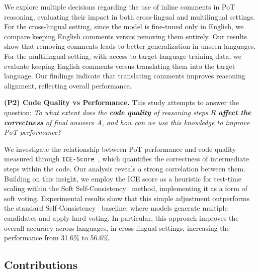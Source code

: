 We explore multiple decisions regarding the use of inline comments in PoT reasoning, evaluating their impact in both cross-lingual and multilingual settings.
%
For the cross-lingual setting, since the model is fine-tuned only in English, we compare keeping English comments versus removing them entirely. 
%
Our results show that removing comments leads to better generalization in unseen languages.
%
For the multilingual setting, with access to target-language training data, we evaluate keeping English comments versus translating them into the target language. 
%
Our findings indicate that translating comments improves reasoning alignment, reflecting overall performance.

\noindent
\textbf{(P2) Code Quality vs Performance.}
%
This study attempts to answer the question: 
%
\emph{
To what extent does the \textbf{code quality} of reasoning steps $R$ \textbf{affect the correctness} of final answers $A$, and how can we use this knowledge to \emph{improve PoT performance}?
}

%
We investigate the relationship between PoT performance and code quality measured through \texttt{ICE-Score}~\cite{ice-score}, which quantifies the correctness of intermediate steps within the code.
%
Our analysis reveals a strong correlation between them.
%
Building on this insight, we employ the ICE score as a heuristic for test-time scaling within the Soft Self-Consistency~\cite{soft-sc} method, implementing it as a form of soft voting.
%
Experimental results show that this simple adjustment outperforms the standard Self-Consistency~\cite{wang2023selfconsistency} baseline, where models generate multiple candidates and apply hard voting.
%
In particular, this approach improves the overall accuracy across languages, in cross-lingual settings, increasing the performance from 31.6\% to 56.6\%.



\subsection{Contributions}


